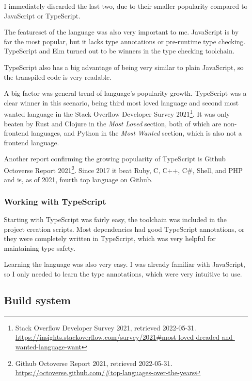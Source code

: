 I immediately discarded the last two, due to their smaller popularity
compared to JavaScript or TypeScript.

The featureset of the language was also very important to me. JavaScript
is by far the most popular, but it lacks type annotations or pre-runtime
type checking. TypeScript and Elm turned out to be winners in the type
checking toolchain.

TypeScript also has a big advantage of being very similar to plain
JavaScript, so the transpiled code is very readable.

A big factor was general trend of language's popularity growth.
TypeScript was a clear winner in this scenario, being third most loved
language and second most wanted language in the Stack Overflow Developer
Survey 2021\footnote{Stack Overflow Developer Survey 2021, retrieved
2022-05-31.
\url{https://insights.stackoverflow.com/survey/2021\#most-loved-dreaded-and-wanted-language-want}}.
It was only beaten by Rust and Clojure in the \emph{Most Loved} section,
both of which are non-frontend languages, and Python in the \emph{Most
Wanted} section, which is also not a frontend language.

Another report confirming the growing popularity of TypeScript is Github
Octoverse Report 2021\footnote{Github Octoverse Report 2021, retrieved
2022-05-31.
\url{https://octoverse.github.com/\#top-languages-over-the-years}}.
Since 2017 it beat Ruby, C, C++, C\#, Shell, and PHP and is, as of 2021,
fourth top language on Github.

\subsubsection{Working with TypeScript}\label{working-with-typescript}

Starting with TypeScript was fairly easy, the toolchain was included in
the project creation scripts. Most dependencies had good TypeScript
annotations, or they were completely written in TypeScript, which was
very helpful for maintaining type safety.

Learning the language was also very easy. I was already familiar with
JavaScript, so I only needed to learn the type annotations, which were
very intuitive to use.

\subsection{Build system}\label{build-system}

